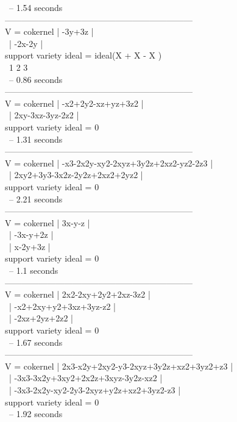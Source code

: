 \begin{sExample}
\                        -- 1.54 seconds\\
------------------------------------------------------------------\\
V = cokernel | -3y+3z |\\
\             | -2x-2y |\\
support variety ideal = ideal(X  + X  - X )\\
\                               1    2    3\\
\                        -- 0.86 seconds\\
------------------------------------------------------------------\\
V = cokernel | -x2+2y2-xz+yz+3z2 |\\
\             | 2xy-3xz-3yz-2z2   |\\
support variety ideal = 0\\
\                        -- 1.31 seconds\\
------------------------------------------------------------------\\
V = cokernel | -x3-2x2y-xy2-2xyz+3y2z+2xz2-yz2-2z3 |\\
\             | 2xy2+3y3-3x2z-2y2z+2xz2+2yz2        |\\
support variety ideal = 0\\
\                        -- 2.21 seconds\\
------------------------------------------------------------------\\
V = cokernel | 3x-y-z   |\\
\             | -3x-y+2z |\\
\             | x-2y+3z  |\\
support variety ideal = 0\\
\                        -- 1.1 seconds\\
------------------------------------------------------------------\\
V = cokernel | 2x2-2xy+2y2+2xz-3z2   |\\
\             | -x2+2xy+y2+3xz+3yz-z2 |\\
\             | -2xz+2yz+2z2          |\\
support variety ideal = 0\\
\                        -- 1.67 seconds\\
------------------------------------------------------------------\\
V = cokernel | 2x3-x2y+2xy2-y3-2xyz+3y2z+xz2+3yz2+z3  |\\
\             | -3x3-3x2y+3xy2+2x2z+3xyz-3y2z-xz2      |\\
\             | -3x3-2x2y-xy2-2y3-2xyz+y2z+xz2+3yz2-z3 |\\
support variety ideal = 0\\
\                        -- 1.92 seconds\\
\endOutput
\end{sExample}

